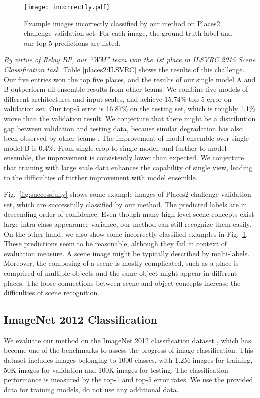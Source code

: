 \documentclass[runningheads]{llncs}
\begin{document}
\begin{figure}[t]
\setlength{\abovecaptionskip}{0pt}
\begin{center}
\texttt{[image: incorrectly.pdf]}
\end{center}
\caption{Example images incorrectly classified by our method on Places2 challenge validation set.
For each image, the ground-truth label and our top-5 predictions are listed.}
\label{fig:incorrectly}
\end{figure}

{\it By virtue of Relay BP, our ``WM'' team won the 1st place in ILSVRC 2015 Scene Classification task.} Table \ref{places2:ILSVRC} shows the results of this challenge. Our five entries won the top five places, and the results of our single model A and B outperform all ensemble results from other teams. We combine five models of different architectures and input scales, and achieve 15.74\% top-5 error on validation set. Our top-5 error is 16.87\% on the testing set, which is roughly 1.1\% worse than the validation result. We conjecture that there might be a distribution gap between validation and testing data, because similar degradation has also been observed by other teams \cite{zhou_2015}. The improvement of model ensemble over single model B is 0.4\%. From single crop to single model, and further to model ensemble, the improvement is consistently lower than expected. We conjecture that training with large scale data enhances the capability of single view, leading to the difficulties of further improvement with model ensemble.

Fig.~\ref{fig:successfully} shows some example images of Places2 challenge validation set, which are successfully classified by our method.
The predicted labels are in descending order of confidence. Even though many high-level scene concepts exist large intra-class appearance variance, our method can still recognize them easily. On the other hand, we also show some incorrectly classified examples in Fig.~\ref{fig:incorrectly}. These predictions seem to be reasonable, although they fail in context of evaluation measure.
A scene image might be typically described by multi-labels. Moreover, the composing of a scene is mostly complicated, such as a place is comprised of multiple objects and the same object might appear in different places. The loose connections between scene and object concepts increase the difficulties of scene recognition.



\subsection{ImageNet 2012 Classification}
\label{experiment:imagenet}
We evaluate our method on the ImageNet 2012 classification dataset \cite{russakovsky_ijcv2015}, which has become one of the benchmarks to assess the progress of image classification. This dataset includes images belonging to 1000 classes, with 1.2M images for training, 50K images for validation and 100K images for testing. The classification performance is measured by the top-1 and top-5 error rates. We use the provided data for training models, do not use any additional data.
\end{document}
